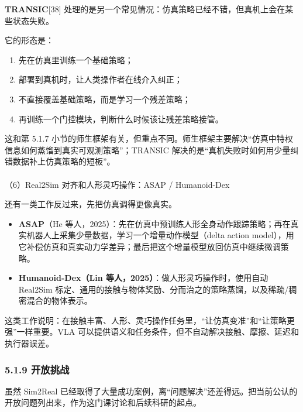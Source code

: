\documentclass[
  chinese,
]{ctexart}
\makeatletter
\let\oldparagraph\paragraph
\renewcommand{\paragraph}{
    \@ifstar
      \xxxParagraphStar
      \xxxParagraphNoStar
  }
\newcommand{\xxxParagraphStar}[1]{\oldparagraph*{#1}\mbox{}}
\newcommand{\xxxParagraphNoStar}[1]{\oldparagraph{#1}\mbox{}}
\providecommand{\tightlist}{%
  \setlength{\itemsep}{0pt}\setlength{\parskip}{0pt}}
\makeatother
\begin{document}
\textbf{TRANSIC}{[}38{]}
处理的是另一个常见情况：仿真策略已经不错，但真机上会在某些状态失败。

它的形态是：

\begin{enumerate}
\def\labelenumi{\arabic{enumi}.}
\tightlist
\item
  先在仿真里训练一个基础策略；
\item
  部署到真机时，让人类操作者在线介入纠正；
\item
  不直接覆盖基础策略，而是学习一个残差策略；
\item
  再训练一个门控模块，判断什么时候该让残差策略接管。
\end{enumerate}

这和第 5.1.7
小节的师生框架有关，但重点不同。师生框架主要解决``仿真中特权信息如何蒸馏到真实可观测策略''；TRANSIC
解决的是``真机失败时如何用少量纠错数据补上仿真策略的短板''。

\paragraph{（6）Real2Sim 对齐和人形灵巧操作：ASAP /
Humanoid-Dex}\label{real2sim-ux5bf9ux9f50ux548cux4ebaux5f62ux7075ux5de7ux64cdux4f5casap-humanoid-dex}

还有一类工作反过来，先把仿真调得更像真实。

\begin{itemize}
\tightlist
\item
  \textbf{ASAP}（He
  等人，2025）：先在仿真中预训练人形全身动作跟踪策略；再在真实机器人上采集少量数据，学习一个增量动作模型（delta
  action
  model），用它补偿仿真和真实动力学差异；最后把这个增量模型放回仿真中继续微调策略。
\item
  \textbf{Humanoid-Dex（Lin 等人，2025）}：做人形灵巧操作时，使用自动
  Real2Sim
  标定、通用的接触与物体奖励、分而治之的策略蒸馏，以及稀疏/稠密混合的物体表示。
\end{itemize}

这类工作说明：在接触丰富、人形、灵巧操作任务里，``让仿真变准''和``让策略更强''一样重要。VLA
可以提供语义和任务条件，但不自动解决接触、摩擦、延迟和执行器误差。

\subsubsection{5.1.9 开放挑战}\label{ux5f00ux653eux6311ux6218}

虽然 Sim2Real
已经取得了大量成功案例，离``问题解决''还差得远。把当前公认的开放问题列出来，作为这门课讨论和后续科研的起点。
\end{document}
